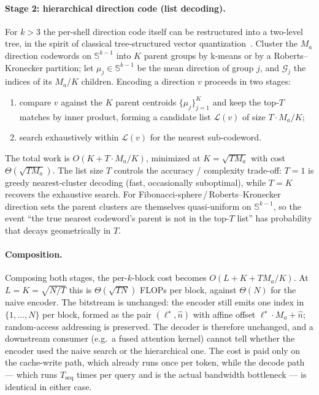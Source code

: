 \documentclass{article}
\theoremstyle{definition}
\theoremstyle{remark}
\newcommand{\bbS}{\mathbb{S}}
\begin{document}
\paragraph{Stage 2: hierarchical direction code (list decoding).}
For $k > 3$ the per-shell direction code itself can be restructured
into a two-level tree, in the spirit of classical tree-structured
vector quantization~\citep{gray1998quantization}.  Cluster the
$M_a$ direction codewords on $\bbS^{k - 1}$ into $K$ parent groups
by k-means or by a Roberts--Kronecker partition; let
$\mu_j \in \bbS^{k - 1}$ be the mean direction of group $j$, and
$\mathcal{G}_j$ the indices of its $M_a / K$ children.  Encoding a
direction $v$ proceeds in two stages:
\begin{enumerate}
\item compare $v$ against the $K$ parent centroids
$\{\mu_j\}_{j = 1}^{K}$ and keep the top-$T$ matches by inner
product, forming a candidate list $\mathcal{L}(v)$ of size
$T \cdot M_a / K$;
\item search exhaustively within $\mathcal{L}(v)$ for the nearest
sub-codeword.
\end{enumerate}
The total work is $O(K + T \cdot M_a / K)$, minimized at
$K = \sqrt{T M_a}$ with cost $\Theta(\sqrt{T M_a})$.  The list size
$T$ controls the accuracy / complexity trade-off: $T = 1$ is greedy
nearest-cluster decoding (fast, occasionally suboptimal), while
$T = K$ recovers the exhaustive search.  For
Fibonacci-sphere\,/\,Roberts--Kronecker direction sets the parent
clusters are themselves quasi-uniform on $\bbS^{k - 1}$, so the
event ``the true nearest codeword's parent is not in the top-$T$
list'' has probability that decays geometrically in $T$.

\paragraph{Composition.}
Composing both stages, the per-$k$-block cost becomes
$O(L + K + T M_a / K)$.  At $L = K = \sqrt{N / T}$ this is
$\Theta(\sqrt{T N})$ FLOPs per block, against $\Theta(N)$ for the
naive encoder.  The bitstream is unchanged: the encoder still emits
one index in $\{1, \ldots, N\}$ per block, formed as the pair
$(\ell^\star, \hat n)$ with affine offset
$\ell^\star \cdot M_a + \hat n$; random-access addressing is
preserved.  The decoder is therefore unchanged, and a downstream
consumer (e.g.\ a fused attention kernel) cannot tell whether the
encoder used the naive search or the hierarchical one.  The cost is
paid only on the cache-write path, which already runs once per
token, while the decode path --- which runs $T_{\mathrm{seq}}$
times per query and is the actual bandwidth bottleneck --- is
identical in either case.
\end{document}
